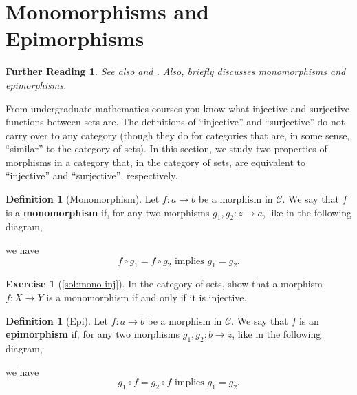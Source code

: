 \documentclass[a4paper,11pt, oneside,titlepage=false]{scrbook}
\theoremstyle{plain}
\newtheorem*{reading*}{Further Reading}
\theoremstyle{definition}
\newtheorem{dfn}[thm]{Definition}
\newtheorem{exer}[thm]{Exercise}
\newcommand{\Cat}[1]{\mathcal{#1}}
\newcommand{\CC}{\Cat{C}}
\newcommand{\co}[2]{\ensuremath{#2 \circ #1}}
\begin{document}
\section{Monomorphisms and Epimorphisms}
\label{sec:mono-epi}

\begin{reading*}
See also \cite[p. 134]{leinster} and \cite[\S\S 2.8--2.9]{barr-wells}.
Also, \cite[\S 2.2]{pierce} briefly discusses monomorphisms and epimorphisms.
\end{reading*}

From undergraduate mathematics courses you know what injective and surjective functions between sets are.
The definitions of ``injective'' and ``surjective'' do not carry over to any category (though they do for categories that are, in some sense, ``similar'' to the category of sets).
In this section, we study two properties of morphisms in a category that, in the category of sets, are equivalent to ``injective'' and ``surjective'', respectively.



\begin{dfn}[Monomorphism]
  Let $f : a \to b$ be a morphism in $\CC$. We say that $f$ is a \textbf{monomorphism} if, for any two morphisms $g_1, g_2 : z \to a$, like in the following diagram,
  \begin{center}
  \end{center}
  we have
  \[ \co{g_1}{f} = \co{g_2}{f} \text{ implies } g_1 = g_2 .\]
\end{dfn}

\begin{exer}[\cref{sol:mono-inj}]\label{ex:mono-inj}
  In the category of sets, show that a morphism $f : X \to Y$ is a monomorphism if and only if it is injective.
\end{exer}

\begin{dfn}[Epi]
  Let $f : a \to b$ be a morphism in $\CC$. We say that $f$ is an \textbf{epimorphism} if, for any two morphisms $g_1, g_2 : b \to z$, like in the following diagram,
  \begin{center}
  \end{center}
  we have
  \[ \co{f}{g_1} = \co{f}{g_2} \text{ implies } g_1 = g_2 .\]
\end{dfn}
\end{document}
